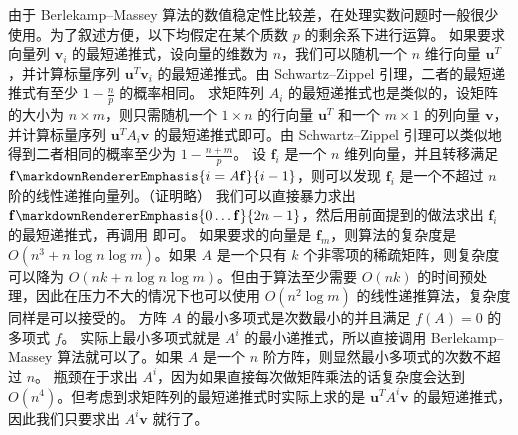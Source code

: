 {}由于 Berlekamp–Massey 算法的数值稳定性比较差，在处理实数问题时一般很少使用。为了叙述方便，以下均假定在某个质数 $p$ 的剩余系下进行运算。\markdownRendererInterblockSeparator
{}\markdownRendererSectionBegin
{}\markdownRendererInterblockSeparator
{}如果要求向量列 $\mathbf{v}_i$ 的最短递推式，设向量的维数为 $n$，我们可以随机一个 $n$ 维行向量 $\mathbf{u}^T$，并计算标量序列 ${\mathbf{u}^T \mathbf{v}_i}$ 的最短递推式。由 Schwartz–Zippel 引理，二者的最短递推式有至少 $1 - \frac{n}{p}$ 的概率相同。\markdownRendererParagraphSeparator
{}求矩阵列 ${A_i}$ 的最短递推式也是类似的，设矩阵的大小为 $n \times m$，则只需随机一个 $1 \times n$ 的行向量 $\mathbf{u}^T$ 和一个 $m \times 1$ 的列向量 $\mathbf{v}$，并计算标量序列 ${\mathbf{u}^T A_i \mathbf{v}}$ 的最短递推式即可。由 Schwartz–Zippel 引理可以类似地得到二者相同的概率至少为 $1 - \frac{n + m}{p}$。\markdownRendererInterblockSeparator
{}
\markdownRendererSectionEnd \markdownRendererSectionBegin
{}\markdownRendererInterblockSeparator
{}设 $\mathbf{f}_i$ 是一个 $n$ 维列向量，并且转移满足 $\mathbf{f}\markdownRendererEmphasis{i = A \mathbf{f}}{i-1}$，则可以发现 ${\mathbf{f}_i}$ 是一个不超过 $n$ 阶的线性递推向量列。（证明略）\markdownRendererParagraphSeparator
{}我们可以直接暴力求出 $\mathbf{f}\markdownRendererEmphasis{0 \dots \mathbf{f}}{2n - 1}$，然后用前面提到的做法求出 ${\mathbf{f}_i}$ 的最短递推式，再调用  即可。\markdownRendererParagraphSeparator
{}如果要求的向量是 $\mathbf{f}_m$，则算法的复杂度是 $O(n^3 + n\log n \log m)$。如果 $A$ 是一个只有 $k$ 个非零项的稀疏矩阵，则复杂度可以降为 $O(nk + n\log n \log m)$。但由于算法至少需要 $O(nk)$ 的时间预处理，因此在压力不大的情况下也可以使用 $O(n^2 \log m)$ 的线性递推算法，复杂度同样是可以接受的。\markdownRendererInterblockSeparator
{}
\markdownRendererSectionEnd \markdownRendererSectionBegin
{}\markdownRendererInterblockSeparator
{}方阵 $A$ 的最小多项式是次数最小的并且满足 $f(A) = 0$ 的多项式 $f$。\markdownRendererParagraphSeparator
{}实际上最小多项式就是 ${A^i}$ 的最小递推式，所以直接调用 Berlekamp–Massey 算法就可以了。如果 $A$ 是一个 $n$ 阶方阵，则显然最小多项式的次数不超过 $n$。\markdownRendererParagraphSeparator
{}瓶颈在于求出 $A^i$，因为如果直接每次做矩阵乘法的话复杂度会达到 $O(n^4)$。但考虑到求矩阵列的最短递推式时实际上求的是 ${\mathbf{u}^T A^i \mathbf{v}}$ 的最短递推式，因此我们只要求出 $A^i \mathbf{v}$ 就行了。\markdownRendererParagraphSeparator
